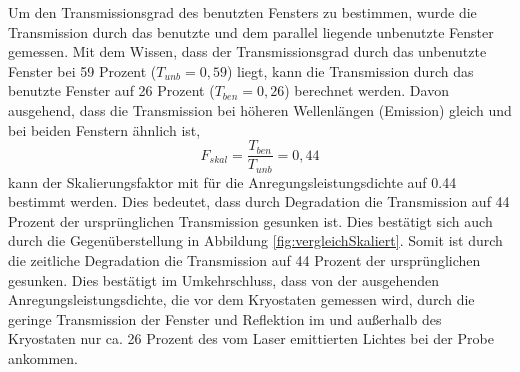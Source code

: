 \newline
Um den Transmissionsgrad des benutzten Fensters zu bestimmen, wurde die Transmission durch das benutzte und dem parallel liegende unbenutzte Fenster gemessen. Mit dem Wissen, dass der Transmissionsgrad durch das unbenutzte Fenster bei 59 Prozent ($T_{unb} = 0,59$) liegt, kann die Transmission durch das benutzte Fenster auf 26 Prozent ($T_{ben} = 0,26$) berechnet werden. 
Davon ausgehend, dass die Transmission bei höheren Wellenlängen (Emission) gleich und bei beiden Fenstern ähnlich ist,
%
\begin{equation}
  F_{skal} = \frac{ T_{ben} }{ T_{unb} } = 0,44\label{eq11}
\end{equation}
%
kann der Skalierungsfaktor mit für die Anregungsleistungsdichte auf 0.44 bestimmt werden. Dies bedeutet, dass durch Degradation die Transmission auf 44 Prozent der ursprünglichen Transmission gesunken ist.
\newline
Dies bestätigt sich auch durch die Gegenüberstellung in  Abbildung \ref{fig:vergleichSkaliert}. Somit ist durch die zeitliche Degradation die Transmission auf 44 Prozent der ursprünglichen gesunken. Dies bestätigt im Umkehrschluss, dass von der ausgehenden Anregungsleistungsdichte, die vor dem Kryostaten gemessen wird, durch die geringe Transmission der Fenster und Reflektion im und außerhalb des Kryostaten nur ca. 26 Prozent des vom Laser emittierten Lichtes bei der Probe ankommen. 